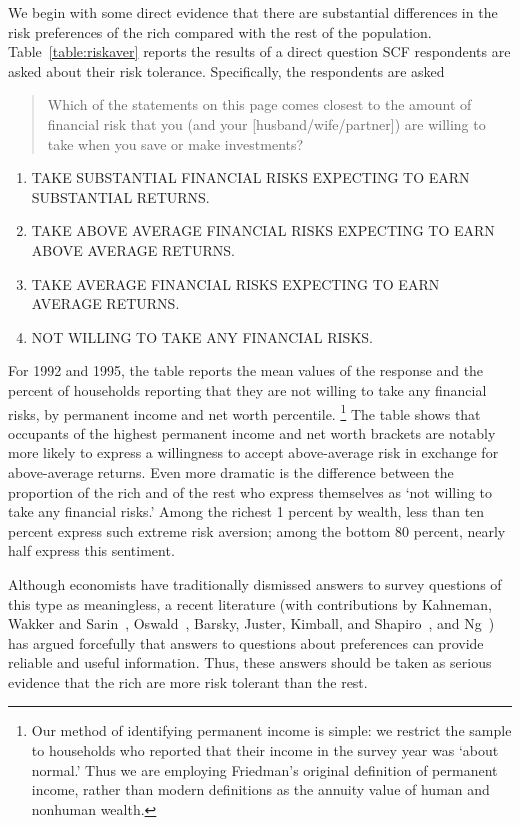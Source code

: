 \documentclass[12pt]{article}
\begin{document}
We begin with some direct evidence that there are substantial differences in
the risk preferences of the rich compared with the rest of the population.
Table~\ref{table:riskaver} reports the results of a direct question SCF
respondents are asked about their risk tolerance. Specifically, the
respondents are asked

\begin{quote}
{\small Which of the statements on this page comes closest to the amount of
financial risk that you (and your [husband/wife/partner]) are willing to
take when you save or make investments? }
\end{quote}

\begin{enumerate}
\item  {\small TAKE SUBSTANTIAL FINANCIAL RISKS EXPECTING TO EARN
SUBSTANTIAL RETURNS. }

\item  {\small TAKE ABOVE AVERAGE FINANCIAL RISKS EXPECTING TO EARN ABOVE
AVERAGE RETURNS. }

\item  {\small TAKE AVERAGE FINANCIAL RISKS EXPECTING TO EARN AVERAGE
RETURNS. }

\item  {\small NOT WILLING TO TAKE ANY FINANCIAL RISKS. }
\end{enumerate}

{\normalsize For 1992 and 1995, the table reports the mean values of the
response and the percent of households reporting that they are not willing
to take any financial risks, by permanent income and net worth percentile.%
\footnote{{\normalsize Our method of identifying permanent income is simple:
we restrict the sample to households who reported that their income in the
survey year was `about normal.' Thus we are employing Friedman's original
definition of permanent income, rather than modern definitions as the
annuity value of human and nonhuman wealth.}} The table shows that occupants
of the highest permanent income and net worth brackets are notably more
likely to express a willingness to accept above-average risk in exchange for
above-average returns. Even more dramatic is the difference between the
proportion of the rich and of the rest who express themselves as `not
willing to take any financial risks.' Among the richest 1 percent by wealth,
less than ten percent express such extreme risk aversion; among the bottom
80 percent, nearly half express this sentiment. }

{\normalsize Although economists have traditionally dismissed answers to
survey questions of this type as meaningless, a recent literature (with
contributions by Kahneman, Wakker and Sarin~\cite{kws:bentham}, Oswald~\cite
{oswald:happiness}, Barsky, Juster, Kimball, and Shapiro~\cite
{bjks:askforcrra}, and Ng~\cite{ng:acase}) has argued forcefully that
answers to questions about preferences can provide reliable and useful
information. Thus, these answers should be taken as serious evidence that
the rich are more risk tolerant than the rest. }
\end{document}
